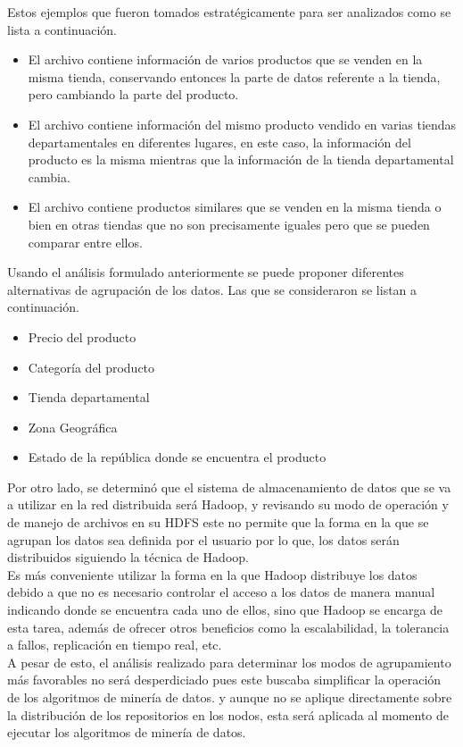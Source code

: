 Estos ejemplos que fueron tomados estratégicamente para ser analizados como se lista a continuación.
\begin{itemize}
    \item El archivo contiene información de varios productos que se venden en la misma tienda, conservando entonces la parte de datos referente a la tienda, pero cambiando la parte del producto. 
    \item El archivo contiene información del mismo producto vendido en varias tiendas departamentales en diferentes lugares, en este caso, la información del producto es la misma mientras que la información de la tienda departamental cambia. 
	\item El archivo contiene productos similares que se venden en la misma tienda o bien en otras tiendas que no son precisamente iguales pero que se pueden comparar entre ellos.
\end{itemize}
Usando el análisis formulado anteriormente se puede proponer diferentes alternativas de agrupación de los datos. Las que se consideraron se listan a continuación.
\begin{itemize}
	\item Precio del producto
	\item Categoría del producto
	\item Tienda departamental
	\item Zona Geográfica
	\item Estado de la república donde se encuentra el producto 
\end{itemize}
Por otro lado, se determinó que el sistema de almacenamiento de datos que se va a utilizar en la red distribuida será Hadoop, y revisando su modo de operación y de manejo de archivos en su HDFS este no permite que la forma en la que se agrupan los datos sea definida por el usuario por lo que, los datos serán distribuidos siguiendo la técnica de Hadoop. \\
Es más conveniente utilizar la forma en la que Hadoop distribuye los datos debido a que no es necesario controlar el acceso a los datos de manera manual indicando donde se encuentra cada uno de ellos, sino que Hadoop se encarga de esta tarea, además de ofrecer otros beneficios como la escalabilidad, la tolerancia a fallos, replicación en tiempo real, etc.  
\\
A pesar de esto, el análisis realizado para determinar los modos de agrupamiento más favorables no será desperdiciado pues este buscaba simplificar la operación de los algoritmos de minería de datos. y aunque no se aplique directamente sobre la distribución de los repositorios en los nodos, esta será aplicada al momento de ejecutar los algoritmos de minería de datos.  

